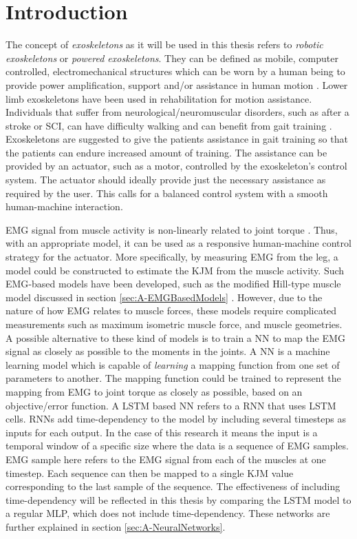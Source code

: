\documentclass[../main.tex]{subfiles}
\begin{document}
\chapter{Introduction}
The concept of \textit{exoskeletons} as it will be used in this thesis refers to \textit{robotic exoskeletons} or \textit{powered exoskeletons}. 
They can be defined as mobile, computer controlled, electromechanical structures which can be worn by a human being to provide power amplification, support and/or assistance in human motion \cite{Anam2012, Gorgey2018}. 
Lower limb exoskeletons have been used in rehabilitation for motion assistance.
Individuals that suffer from neurological/neuromuscular disorders, such as after a stroke or \ac{SCI}, can have difficulty walking and can benefit from gait training \cite{Gorgey2018, Young2017, Lerner2017}.
Exoskeletons are suggested to give the patients assistance in gait training so that the patients can endure increased amount of training.
The assistance can be provided by an actuator, such as a motor, controlled by the exoskeleton's control system.
The actuator should ideally provide just the necessary assistance as required by the user.
This calls for a balanced control system with a smooth human-machine interaction.

\Ac{EMG} signal from muscle activity is non-linearly related to joint torque \cite{Young2017}.
Thus, with an appropriate model, it can be used as a responsive human-machine control strategy for the actuator.
More specifically, by measuring \ac{EMG} from the leg, a model could be constructed to estimate the \ac{KJM} from the muscle activity.
Such \ac{EMG}-based models have been developed, such as the modified Hill-type muscle model discussed in section \ref{sec:A-EMGBasedModels} \cite{Pizzolato2015, Erdemir2007, Lloyd2003}.
However, due to the nature of how \ac{EMG} relates to muscle forces, these models require complicated measurements such as maximum isometric muscle force, and muscle geometries.
A possible alternative to these kind of models is to train a \ac{NN} to map the \ac{EMG} signal as closely as possible to the moments in the joints.
A \ac{NN} is a machine learning model which is capable of \textit{learning} a mapping function from one set of parameters to another. 
The mapping function could be trained to represent the mapping from \ac{EMG} to joint torque as closely as possible, based on an objective/error function.
A \ac{LSTM} based \ac{NN} refers to a \ac{RNN} that uses \ac{LSTM} cells.
\acp{RNN} add time-dependency to the model by including several timesteps as inputs for each output.
In the case of this research it means the input is a temporal window of a specific size where the data is a sequence of \ac{EMG} samples.
\ac{EMG} sample here refers to the \ac{EMG} signal from each of the muscles at one timestep.
Each sequence can then be mapped to a single \ac{KJM} value corresponding to the last sample of the sequence.
The effectiveness of including time-dependency will be reflected in this thesis by comparing the \ac{LSTM} model to a regular \ac{MLP}, which does not include time-dependency.
These networks are further explained in section \ref{sec:A-NeuralNetworks}.
\end{document}
